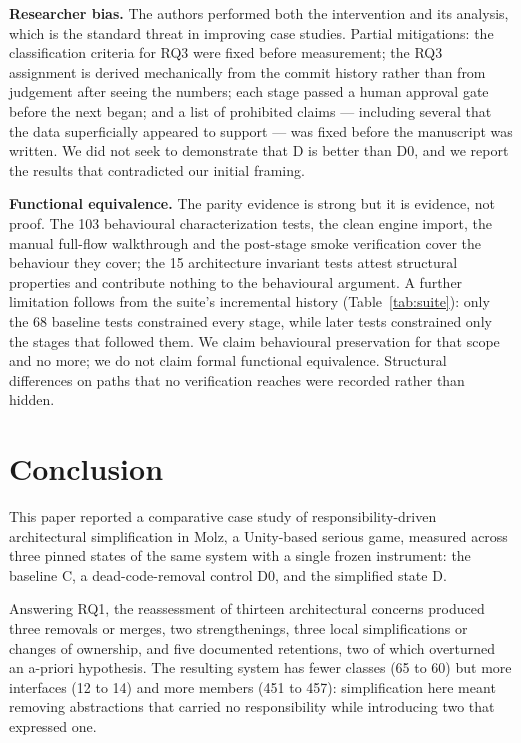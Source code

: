 \documentclass{sbc2019}%
\begin{document}
\medskip\noindent\textbf{Researcher bias.} The authors performed both the
intervention and its analysis, which is the standard threat in improving case
studies. Partial mitigations: the classification criteria for RQ3 were fixed
before measurement; the RQ3 assignment is derived mechanically from the commit
history rather than from judgement after seeing the numbers; each stage passed a
human approval gate before the next began; and a list of prohibited claims ---
including several that the data superficially appeared to support --- was fixed
before the manuscript was written. We did not seek to demonstrate that D is
better than D0, and we report the results that contradicted our initial framing.

\medskip\noindent\textbf{Functional equivalence.} The parity evidence is strong
but it is evidence, not proof. The 103 behavioural characterization tests, the
clean engine import, the manual full-flow walkthrough and the post-stage smoke
verification cover the behaviour they cover; the 15 architecture invariant tests
attest structural properties and contribute nothing to the behavioural argument.
A further limitation follows from the suite's incremental history
(Table~\ref{tab:suite}): only the 68 baseline tests constrained every stage,
while later tests constrained only the stages that followed them. We claim behavioural preservation
for that scope and no more; we do not claim formal functional equivalence.
Structural differences on paths that no verification reaches were recorded rather
than hidden.


\FloatBarrier

\section{Conclusion}\label{sec:conclusion}

This paper reported a comparative case study of responsibility-driven
architectural simplification in Molz, a Unity-based serious game, measured across
three pinned states of the same system with a single frozen instrument: the
baseline C, a dead-code-removal control D0, and the simplified state D.

Answering RQ1, the reassessment of thirteen architectural concerns produced three
removals or merges, two strengthenings, three local simplifications or changes of
ownership, and five documented retentions, two of which overturned an a-priori
hypothesis. The resulting system has fewer classes
(65 to 60) but more interfaces (12 to 14) and more members (451 to 457):
simplification here meant removing abstractions that carried no responsibility
while introducing two that expressed one.
\end{document}
